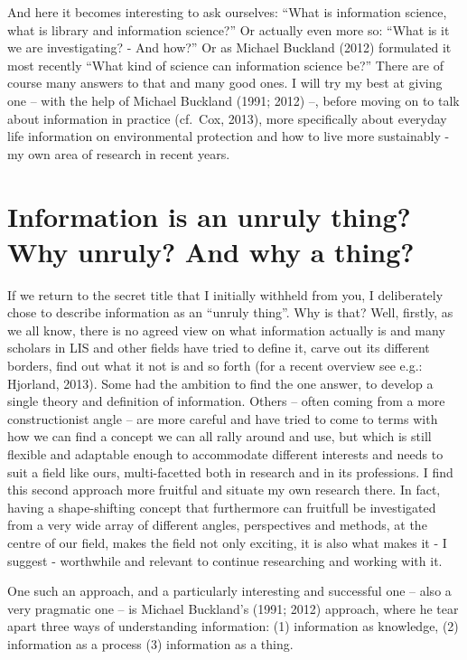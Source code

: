 ﻿\documentclass[a4paper,
fontsize=11pt,
oneside,
numbers=noperiodatend,
parskip=half-,
bibliography=totoc,
final
]{scrartcl}
\begin{document}
And here it becomes interesting to ask ourselves: \enquote{What is
information science, what is library and information science?} Or
actually even more so: \enquote{What is it we are investigating? - And
how?} Or as Michael Buckland (2012) formulated it most recently
\enquote{What kind of science can information science be?} There are of
course many answers to that and many good ones. I will try my best at
giving one -- with the help of Michael Buckland (1991; 2012) --, before
moving on to talk about information in practice (cf.~Cox, 2013), more
specifically about everyday life information on environmental protection
and how to live more sustainably - my own area of research in recent
years.

\section*{Information is an unruly thing? Why unruly? And why a
thing?}\label{information-is-an-unruly-thing-why-unruly-and-why-a-thing}

If we return to the secret title that I initially withheld from you, I
deliberately chose to describe information as an \enquote{unruly thing}.
Why is that? Well, firstly, as we all know, there is no agreed view on
what information actually is and many scholars in LIS and other fields
have tried to define it, carve out its different borders, find out what
it not is and so forth (for a recent overview see e.g.: Hjorland, 2013).
Some had the ambition to find the one answer, to develop a single theory
and definition of information. Others -- often coming from a more
constructionist angle -- are more careful and have tried to come to
terms with how we can find a concept we can all rally around and use,
but which is still flexible and adaptable enough to accommodate
different interests and needs to suit a field like ours, multi-facetted
both in research and in its professions. I find this second approach
more fruitful and situate my own research there. In fact, having a
shape-shifting concept that furthermore can fruitfull be investigated
from a very wide array of different angles, perspectives and methods, at
the centre of our field, makes the field not only exciting, it is also
what makes it - I suggest - worthwhile and relevant to continue
researching and working with it.

One such an approach, and a particularly interesting and successful one
-- also a very pragmatic one -- is Michael Buckland's (1991; 2012)
approach, where he tear apart three ways of understanding information:
(1) information as knowledge, (2) information as a process (3)
information as a thing.
\end{document}
